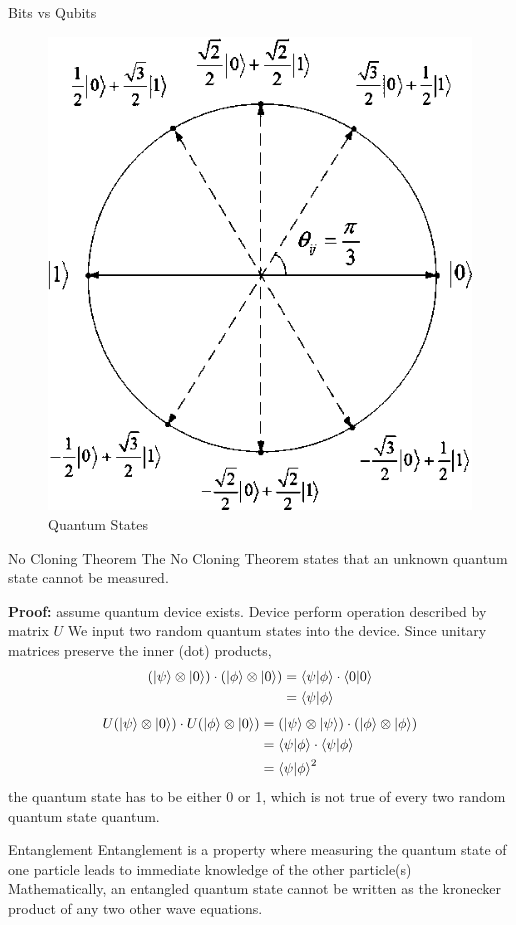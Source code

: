 \documentclass[final, 20pt]{beamer}
\newlength{\onecolwid}
\begin{document}
\begin{frame}[t]
\begin{columns}[t]
\begin{column}{\onecolwid}
\begin{block}{Bits vs Qubits}
\end{block}
\begin{figure}
\includegraphics[width=0.67\linewidth]{qubit.png}
\caption{Quantum States}
\end{figure}
\begin{block}{No Cloning Theorem}
The No Cloning Theorem states that an unknown quantum state cannot be measured.

\textbf{Proof:} assume quantum device exists. Device perform operation described by matrix $U$ We input two random quantum states into the device.
Since unitary matrices preserve the inner (dot) products,
\begin{align}
	(\ket{\psi} \otimes \ket{0})
	\cdot
	(\ket{\phi} \otimes \ket{0})
	&= \braket{\psi}{\phi} \cdot \braket{0}{0}
	\\ &= \braket{\psi}{\phi}	
\end{align}
\vspace{-1cm}
\begin{align}
	U(\ket{\psi} \otimes \ket{0})
	\cdot
	U(\ket{\phi} \otimes \ket{0})
	&= (\ket{\psi} \otimes \ket{\psi})
	\cdot
	(\ket{\phi} \otimes \ket{\phi})
	\\
	&= \braket{\psi}{\phi} \cdot \braket{\psi}{\phi}
	\\
	&= \braket{\psi}{\phi}^2
\end{align}
the quantum state has to be either 0 or 1, which is not true of every two random quantum state quantum.

\end{block}

\begin{block}{Entanglement}
Entanglement is a property where measuring the quantum state of one particle leads to immediate knowledge of the other particle(s)
Mathematically, an entangled quantum state cannot be written as the kronecker product of any two other wave equations.


\end{block}
\end{column}
\end{columns}
\end{frame}
\end{document}
